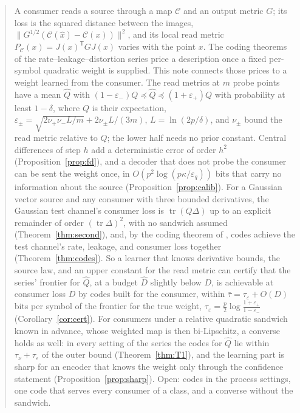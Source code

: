 \documentclass[11pt,onecolumn]{IEEEtran}
\newcommand{\tr}{\operatorname{tr}}
\newcommand{\PC}{P_{\mathcal C}}
\newcommand{\nup}{\nu_{+}}
\newcommand{\num}{\nu_{-}}
\newcommand{\epp}{\varepsilon_{+}}
\newcommand{\emm}{\varepsilon_{-}}
\begin{document}
\begin{abstract}
A consumer reads a source through a map $\mathcal C$ and an output metric $G$; its
loss is the squared distance between the images, $\|G^{1/2}(\mathcal C(\hat x)-\mathcal C(x))\|^2$,
and its local read metric $\PC(x)=J(x)^{\mathsf T}GJ(x)$ varies with the point $x$.
The coding theorems of the rate--leakage--distortion series
\cite{part1,part2,part3,part4} price a description once a fixed per-symbol quadratic
weight is supplied. This note connects those prices to a weight learned from the
consumer. The read metrics at $m$ probe points have a mean $\hat Q$ with
$(1-\emm)Q\preceq\hat Q\preceq(1+\epp)Q$ with probability at least $1-\delta$, where $Q$
is their expectation, $\varepsilon_\pm=\sqrt{2\nup\num L/m}+2\nu_\pm L/(3m)$,
$L=\ln(2p/\delta)$, and $\nu_\pm$ bound the read metric relative to $Q$; the lower half
needs no prior constant. Central differences of step $h$ add a deterministic error of
order $h^2$ (Proposition~\ref{prop:fd}), and a decoder that does not probe the consumer
can be sent the weight once, in $O(p^2\log(p\kappa/\varepsilon_q))$ bits that carry no
information about the source (Proposition~\ref{prop:calib}). For a Gaussian vector source and any consumer
with three bounded derivatives, the Gaussian test channel's consumer loss is
$\tr(Q\Delta)$ up to an explicit remainder of order $(\tr\Delta)^2$, with no
sandwich assumed (Theorem~\ref{thm:second}), and, by the coding theorem of
\cite{part1}, codes achieve the test channel's rate, leakage, and consumer loss
together (Theorem~\ref{thm:codes}). So a learner that knows derivative bounds, the
source law, and an upper constant for the read metric can certify that the series'
frontier for $\hat Q$, at a budget $\hat D$ slightly below $D$, is achievable at consumer
loss $D$ by codes built for the consumer, within
$\bar\tau=\tau_\varepsilon+O(D)$ bits per symbol of the frontier for the true weight,
$\tau_\varepsilon=\tfrac p2\log\frac{1+\epp}{1-\emm}$ (Corollary~\ref{cor:cert}). For
consumers under a relative quadratic sandwich known in advance, whose weighted map is
then bi-Lipschitz, a converse holds as well: in every setting of the series the codes
for $\hat Q$ lie within $\tau_\nu+\tau_\varepsilon$ of the outer bound
(Theorem~\ref{thm:T1}), and the learning part is sharp for an encoder that knows the
weight only through the confidence statement (Proposition~\ref{prop:sharp}). Open:
codes in the process settings, one code that serves every consumer of a class, and a
converse without the sandwich.
\end{abstract}
\end{document}
